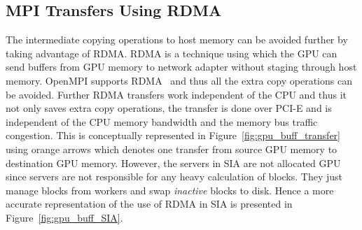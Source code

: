 \subsection{MPI Transfers Using RDMA}
The intermediate copying operations to host memory can be avoided further by
taking advantage of RDMA. RDMA is a technique using
which the GPU can send buffers from GPU memory to network adapter without staging
through host memory. OpenMPI supports RDMA~\cite{openmpi-cudaaware} and thus all
the extra copy operations can be avoided.
Further RDMA transfers work independent of the CPU and thus it not only saves
extra copy operations, the transfer is done over PCI-E and is independent
of the CPU memory bandwidth and the memory bus traffic congestion.
This is conceptually represented in Figure~\ref{fig:gpu_buff_transfer} using orange
arrows which denotes one transfer from source GPU memory to destination GPU memory.
However, the servers in SIA are not allocated GPU since servers are not responsible
for any heavy calculation of blocks. They just manage blocks from workers and
swap \textit{inactive} blocks to disk. Hence a more accurate representation of
the use of RDMA in SIA is presented in Figure~\ref{fig:gpu_buff_SIA}.

